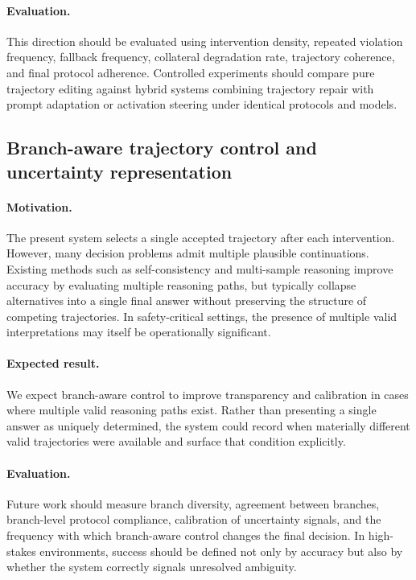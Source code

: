 \documentclass[twocolumn]{article}
\begin{document}
\paragraph{Evaluation.}
This direction should be evaluated using intervention density, repeated
violation frequency, fallback frequency, collateral degradation rate,
trajectory coherence, and final protocol adherence. Controlled experiments
should compare pure trajectory editing against hybrid systems combining
trajectory repair with prompt adaptation or activation steering under identical
protocols and models.

\subsection{Branch-aware trajectory control and uncertainty
representation}\label{sec:future_branch_aware}

\paragraph{Motivation.}
The present system selects a single accepted trajectory after each intervention.
However, many decision problems admit multiple plausible continuations. Existing
methods such as self-consistency and multi-sample reasoning improve accuracy by
evaluating multiple reasoning paths, but typically collapse alternatives into a
single final answer without preserving the structure of competing trajectories.
In safety-critical settings, the presence of multiple valid interpretations may
itself be operationally significant.

\paragraph{Expected result.}
We expect branch-aware control to improve transparency and calibration in cases
where multiple valid reasoning paths exist. Rather than presenting a single
answer as uniquely determined, the system could record when materially different
valid trajectories were available and surface that condition explicitly.

\paragraph{Evaluation.}
Future work should measure branch diversity, agreement between branches,
branch-level protocol compliance, calibration of uncertainty signals, and the
frequency with which branch-aware control changes the final decision. In
high-stakes environments, success should be defined not only by accuracy but
also by whether the system correctly signals unresolved ambiguity.
\end{document}
